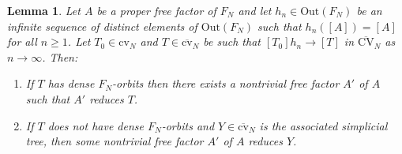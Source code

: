 \documentclass[10pt]{amsart}
\newcommand\<{\langle}
\renewcommand\>{\rangle}
\newcommand{\Out}{\mbox{Out}}
\newcommand{\cvn}{\mbox{cv}_N}
\newcommand{\cvnbar}{\overline{\mbox{cv}}_N}
\newcommand{\CVNbar}{\overline{\mbox{CV}}_N}
\newtheorem{lem}[thm]{Lemma}
\theoremstyle{definition}
\begin{document}
\begin{lem}\label{lem:reduce1}
Let $A$ be a proper free factor of $F_N$ and let $h_n\in \Out(F_N)$ be an infinite sequence of distinct elements of $\Out(F_N)$ such that $h_n([A])=[A]$ for all $n\ge 1$.
Let $T_0\in\cvn$ and $T\in\cvnbar$ be such that $[T_0]h_n\to [T]$ in
$\CVNbar$ as $n\to\infty$. Then:
\begin{enumerate}
\item If $T$ has dense $F_N$-orbits then there exists a nontrivial free factor $A'$ of $A$ such that $A'$
 reduces $T$.

\item If $T$ does not have dense $F_N$-orbits and $Y\in\cvnbar$ is the associated simplicial tree, then some
  nontrivial free factor $A'$ of $A$ reduces $Y$.

\end{enumerate}

\end{lem}
\end{document}
